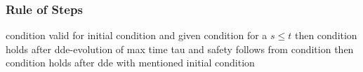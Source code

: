 \documentclass[10pt]{report}
\begin{document}
\begin{calculus}
{            }{}
        \end{calculus}

        \subsubsection{Rule of Steps}
            \label{sec:rule-of-steps}

            condition valid for initial condition and given condition for a $s\leq t$ then condition holds after dde-evolution of max time tau and safety follows from condition then condition holds after dde with mentioned initial condition

            \begin{calculus}
            \end{calculus}
\end{document}
